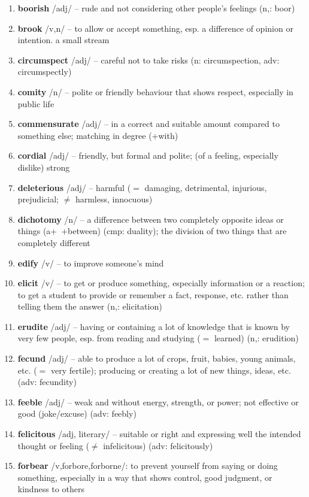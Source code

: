 \begin{enumerate}[wide,labelindent=0pt]
\item \textbf{boorish} /adj/ -- rude and not considering other people's feelings (n,: boor)
\item \textbf{brook} /v,n/ --  to allow or accept something, esp. a difference of opinion or intention.  a small stream
\item \textbf{circumspect} /adj/ -- careful not to take risks (n: circumspection, adv: circumspectly)
\item \textbf{comity} /n/ -- polite or friendly behaviour that shows respect, especially in public life
\item \textbf{commensurate} /adj/ -- in a correct and suitable amount compared to something else; matching in degree (+with)
\item \textbf{cordial} /adj/ -- friendly, but formal and polite; (of a feeling, especially dislike) strong
\item \textbf{deleterious} /adj/ -- harmful  ($=$ damaging, detrimental, injurious, prejudicial; $\neq$ harmless, innocuous)
\item \textbf{dichotomy} /n/ -- a difference between two completely opposite ideas or things (a+~+between) (cmp: duality); the division of two things that are completely different
\item \textbf{edify} /v/ -- to improve someone's mind
\item \textbf{elicit} /v/ -- to get or produce something, especially information or a reaction; to get a student to provide or remember a fact, response, etc. rather than telling them the answer (n,: elicitation)
\item \textbf{erudite} /adj/ -- having or containing a lot of knowledge that is known by very few people, esp. from reading and studying ($=$ learned) (n,: erudition)
\item \textbf{fecund} /adj/ -- able to produce a lot of crops, fruit, babies, young animals, etc. ($=$ very fertile); producing or creating a lot of new things, ideas, etc. (adv: fecundity)
\item \textbf{feeble} /adj/ -- weak and without energy, strength, or power; not effective or good (joke/excuse) (adv: feebly)
\item \textbf{felicitous} /adj, literary/ -- suitable or right and expressing well the intended thought or feeling ($\neq$ infelicitous) (adv: felicitously)
\item \textbf{forbear} /v,forbore,forborne/: to prevent yourself from saying or doing something, especially in a way that shows control, good judgment, or kindness to others

\end{enumerate}
